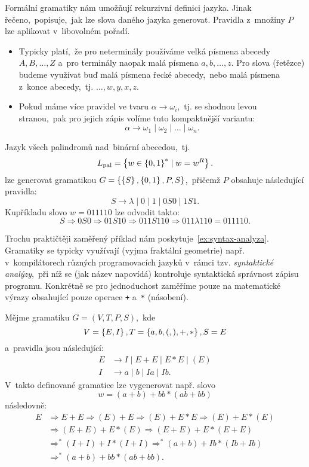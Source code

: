 Formální gramatiky nám umožňují rekurzivní definici jazyka. Jinak řečeno,~popisuje,~jak lze slova daného jazyka generovat. Pravidla z~množiny $P$ lze aplikovat v~libovolném pořadí.
\begin{remark}
    \begin{itemize}
        \item Typicky platí,~že pro neterminály používáme velká písmena abecedy $A,B,\ldots,Z$ a~pro terminály naopak malá písmena $a,b,\ldots,z$. Pro slova (řetězce) budeme využívat buď malá písmena řecké abecedy,~nebo malá písmena z~konce abecedy,~tj. $\dots,w,y,x,z$.
        \item Pokud máme více pravidel ve tvaru $\alpha\to\omega_i$,~tj. se shodnou levou stranou,~pak pro jejich zápis volíme tuto kompaktnější variantu:
        \[\alpha\to\omega_1\mid\omega_2\mid\dots\mid\omega_n.\]
    \end{itemize}
\end{remark}
\begin{example}
    Jazyk všech palindromů nad~binární abecedou,~tj.
    \[L_\text{pal}=\left\{w\in\left\{0,1\right\}^*\mid w=w^R\right\}.\]
    lze generovat gramatikou $G=\left\{\left\{S\right\},\left\{0,1\right\},P,S\right\}$,~přičemž $P$ obsahuje následující pravidla:
    \[S\to\lambda\mid 0\mid 1\mid 0S0\mid 1S1.\]
    Kupříkladu slovo $w=011110$ lze odvodit takto:
    \[S\Rightarrow 0S0\Rightarrow 01S10\Rightarrow011S110\Rightarrow011\lambda 110=011110.\]
\end{example}
Trochu praktičtěji zaměřený příklad nám poskytuje~\ref{ex:syntax-analyza}. Gramatiky se typicky využívají (vyjma fraktální geometrie) např. v~kompilátorech různých programovacích jazyků v~rámci tzv. \emph{syntaktické analýzy},~při níž se (jak název napovídá) kontroluje syntaktická správnost zápisu programu. Konkrétně se pro jednoduchost zaměříme pouze na matematické výrazy obsahující pouze operace \texttt{+} a~\texttt{*} (násobení).
\begin{example}\label{ex:syntax-analyza}
    Mějme gramatiku $G=(V,T,P,S)$,~kde
    \[V=\left\{E,I\right\},T=\left\{a,b,(,),+,*\right\},S=E\]
    a~pravidla jsou následující:
    \begin{align*}
        E&\to I\mid E+E\mid E*E\mid (E)\\
        I&\to a\mid b\mid Ia\mid Ib.
    \end{align*}
    V~takto definované gramatice lze vygenerovat např. slovo
    \[w=(a+b)+bb*(ab+bb)\]
    následovně:
    \begin{align*}
        E&\Rightarrow E+E\Rightarrow(E)+E\Rightarrow(E)+E*E\Rightarrow(E)+E*(E)\\
        &\Rightarrow(E+E)+E*(E)\Rightarrow(E+E)+E*(E+E)\\
        &\Rightarrow^*(I+I)+I*(I+I)\Rightarrow^*(a+b)+Ib*(Ib+Ib)\\
        &\Rightarrow^*(a+b)+bb*(ab+bb).
    \end{align*}
\end{example}
